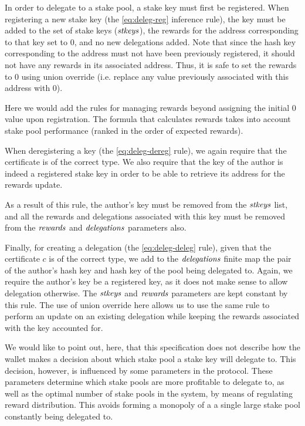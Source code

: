 In order to delegate to a stake pool, a stake key must first be registered.
When registering a new stake key (the \cref{eq:deleg-reg} inference rule),
the key must be
added to the set of stake keys ($\mathit{stkeys}$), the rewards for the address
corresponding to that key set to 0, and no new delegations added. Note that
since the hash key corresponding to the address must not have been previously
registered,
it should not have any rewards in its associated address. Thus, it is safe
to set the rewards to 0 using union override (i.e. replace any value previously
associated with this address with 0).

\begin{todo}
Here we would add the rules for managing rewards beyond assigning
the initial 0 value upon registration. The formula that calculates rewards
takes into account stake pool
performance (ranked in the order of expected rewards).
\end{todo}

When deregistering a key (the \cref{eq:deleg-dereg} rule), we again
require that the certificate is of the correct type. We also require
that the key of the author is indeed a registered stake key
in order to be able to retrieve its address for the rewards update.

As a result of this rule, the author's key must be removed from the $\mathit{stkeys}$ list,
and all the rewards and delegations associated with this key must be removed
from the $\mathit{rewards}$ and $\mathit{delegations}$ parameters also.

Finally, for creating a delegation (the \cref{eq:deleg-deleg} rule),
given that the certificate $c$ is of the correct type, we add to the
$\mathit{delegations}$ finite map the pair of
the author's hash key and hash key of the pool being delegated to.
Again, we require the author's key be a registered key, as it does not make
sense to allow delegation otherwise.
The $\mathit{stkeys}$ and $\mathit{rewards}$ parameters are kept constant by
this rule. The use of union override here allows us to use the same rule
to perform an update on an existing delegation while keeping the rewards
associated with the key accounted for.

We would like to point out, here, that this specification does not describe
how the wallet makes a decision about which stake pool a stake key will
delegate to. This decision, however, is influenced by some parameters in the
protocol. These parameters determine which stake pools are more profitable
to delegate to, as well as the optimal number of stake pools in the system,
by means of regulating reward distribution.
This avoids forming a monopoly of a a single large stake pool constantly
being delegated to.


